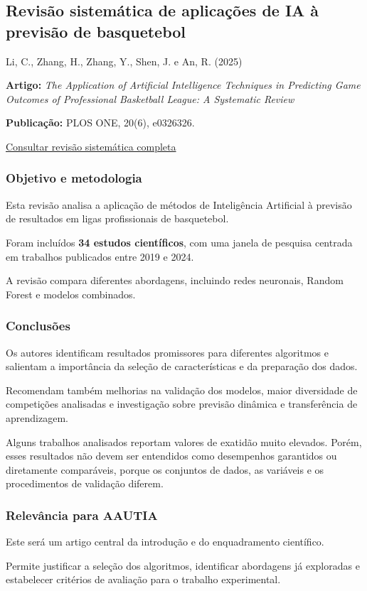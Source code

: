 \subsection{Revisão sistemática de aplicações de IA à previsão de
basquetebol}\label{aautia:revisuxe3o-sistemuxe1tica-de-aplicauxe7uxf5es-de-ia-uxe0-previsuxe3o-de-basquetebol}

Li, C., Zhang, H., Zhang, Y., Shen, J. e An, R. (2025) \cite{li2025}

\textbf{Artigo:} \emph{The Application of Artificial Intelligence
Techniques in Predicting Game Outcomes of Professional Basketball
League: A Systematic Review}

\textbf{Publicação:} PLOS ONE, 20(6), e0326326.

\href{https://doi.org/10.1371/journal.pone.0326326}{Consultar revisão
sistemática completa}

\subsubsection{Objetivo e metodologia}\label{aautia:objetivo-e-metodologia-4}

Esta revisão analisa a aplicação de métodos de Inteligência Artificial à
previsão de resultados em ligas profissionais de basquetebol.

Foram incluídos \textbf{34 estudos científicos}, com uma janela de
pesquisa centrada em trabalhos publicados entre 2019 e 2024.

A revisão compara diferentes abordagens, incluindo redes neuronais,
Random Forest e modelos combinados.

\subsubsection{Conclusões}\label{aautia:conclusuxf5es}

Os autores identificam resultados promissores para diferentes algoritmos
e salientam a importância da seleção de características e da preparação
dos dados.

Recomendam também melhorias na validação dos modelos, maior diversidade
de competições analisadas e investigação sobre previsão dinâmica e
transferência de aprendizagem.

Alguns trabalhos analisados reportam valores de exatidão muito elevados.
Porém, esses resultados não devem ser entendidos como desempenhos
garantidos ou diretamente comparáveis, porque os conjuntos de dados, as
variáveis e os procedimentos de validação diferem.

\subsubsection{Relevância para
AAUTIA}\label{aautia:relevuxe2ncia-para-aautia-4}

Este será um artigo central da introdução e do enquadramento científico.

Permite justificar a seleção dos algoritmos, identificar abordagens já
exploradas e estabelecer critérios de avaliação para o trabalho
experimental.
